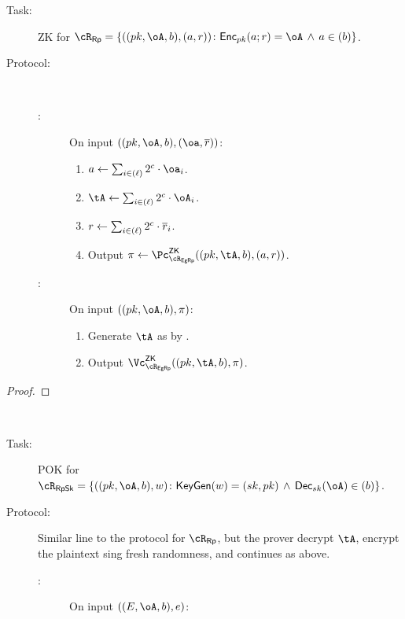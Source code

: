 \begin{description}
\begin{description}
	\item[Task:] ZK for $\rRp =\rRpDef$.
	
	\item[Protocol:]~
	
	\begin{description}
	\item[\Pc:] On input $((\pk,\oA,b),(\oa,\orr))$:
	
	\begin{enumerate}
			\item   $a \asn  \sum_{i\in (\ell)}   2^c \cdot \oa_i$. 
		\item    $\tA \asn  \sum_{i\in (\ell)}    2^c \cdot \oA_i$. 
		\item    $r \leftarrow  \sum_{i\in (\ell)}  2^c \cdot \overline{r}_i$. 
        
        \item  Output $\pi \asn \pZK{\rEgRp}((\pk,\tA,b), (a,r))$.
        
	\end{enumerate}
	
	
\item[\Vc:] On input $((\pk,\oA,b),\pi)$:
	
	\begin{enumerate}
		\item   Generate $\tA$ as by \Pc.
		\item  Output $\vZK{\rEgRp}((\pk,\tA,b), \pi)$.
		
	\end{enumerate}
	
\end{description}
\end{description}

		\begin{proof}
		\end{proof}
\item[In-range proof using sceret key.]~  

\begin{description}
	\item[Task:] POK for $\rRpSk =\rRpSkDef$.
	
	
	\item[Protocol:] Similar line to the protocol for $\rRp$, but  the prover  decrypt $\tA$, encrypt the plaintext sing  fresh randomness, and continues as above.
	
	
	\begin{description}
		\item[\Pc:] On input $((E,\oA,b),e)$:
		

\end{description}
\end{description}
\end{description}
